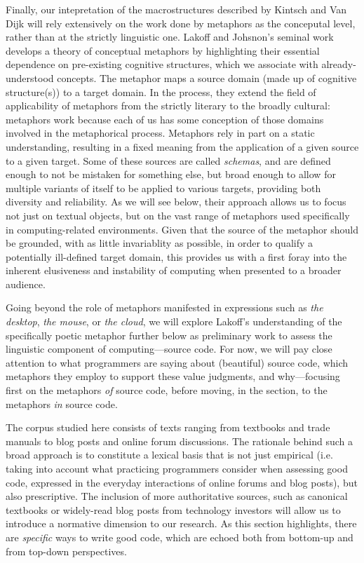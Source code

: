Finally, our intepretation of the macrostructures described by Kintsch and Van Dijk will rely extensively on the work done by metaphors as the conceputal level, rather than at the strictly linguistic one. Lakoff and Johsnon's seminal work develops a theory of conceptual metaphors by highlighting their essential dependence on pre-existing cognitive structures, which we associate with already-understood concepts. The metaphor maps a source domain (made up of cognitive structure(s)) to a target domain. In the process, they extend the field of applicability of metaphors from the strictly literary to the broadly cultural: metaphors work because each of us has some conception of those domains involved in the metaphorical process. Metaphors rely in part on a static understanding, resulting in a fixed meaning from the application of a given source to a given target. Some of these sources are called \emph{schemas}, and are defined enough to not be mistaken for something else, but broad enough to allow for multiple variants of itself to be applied to various targets\cite{lakoff_metaphors_1980}, providing both diversity and reliability. As we will see below, their approach allows us to focus not just on textual objects, but on the vast range of metaphors used specifically in computing-related environments. Given that the source of the metaphor should be grounded, with as little invariablity as possible, in order to qualify a potentially ill-defined target domain, this provides us with a first foray into the inherent elusiveness and instability of computing when presented to a broader audience.

Going beyond the role of metaphors manifested in expressions such as \emph{the desktop}, \emph{the mouse}, or \emph{the cloud}, we will explore Lakoff's understanding of the specifically poetic metaphor further below as preliminary work to assess the linguistic component of computing—source code. For now, we will pay close attention to what programmers are saying about (beautiful) source code, which metaphors they employ to support these value judgments, and why—focusing first on the metaphors \emph{of} source code, before moving, in the section, to the metaphors \emph{in} source code.


The corpus studied here consists of texts ranging from textbooks and trade manuals to blog posts and online forum discussions. The rationale behind such a broad approach is to constitute a lexical basis that is not just empirical (i.e. taking into account what practicing programmers consider when assessing good code, expressed in the everyday interactions of online forums and blog posts), but also prescriptive. The inclusion of more authoritative sources, such as canonical textbooks or widely-read blog posts from technology investors will allow us to introduce a normative dimension to our research. As this section highlights, there are \emph{specific} ways to write good code, which are echoed both from bottom-up and from top-down perspectives.

